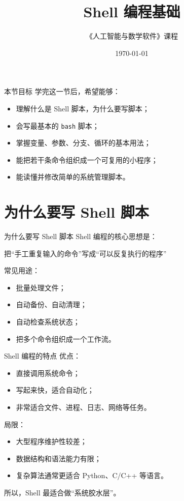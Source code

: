 \documentclass[aspectratio=169]{beamer}
\title{Shell 编程基础}
\author{《人工智能与数学软件》课程}
\date{\today}
\begin{document}
\begin{frame}
  \titlepage
\end{frame}

\begin{frame}{本节目标}
学完这一节后，希望能够：
\begin{itemize}
  \item 理解什么是 Shell 脚本，为什么要写脚本；
  \item 会写最基本的 \texttt{bash} 脚本；
  \item 掌握变量、参数、分支、循环的基本用法；
  \item 能把若干条命令组织成一个可复用的小程序；
  \item 能读懂并修改简单的系统管理脚本。
\end{itemize}
\end{frame}

\section{为什么要写 Shell 脚本}

\begin{frame}{为什么要写 Shell 脚本}
Shell 编程的核心思想是：

\begin{center}
\Large
把“手工重复输入的命令”写成“可以反复执行的程序”
\end{center}

\vspace{0.5em}
常见用途：
\begin{itemize}
  \item 批量处理文件；
  \item 自动备份、自动清理；
  \item 自动检查系统状态；
  \item 把多个命令组织成一个工作流。
\end{itemize}
\end{frame}

\begin{frame}{Shell 编程的特点}
优点：
\begin{itemize}
  \item 直接调用系统命令；
  \item 写起来快，适合自动化；
  \item 非常适合文件、进程、日志、网络等任务。
\end{itemize}

\vspace{0.5em}
局限：
\begin{itemize}
  \item 大型程序维护性较差；
  \item 数据结构和语法能力有限；
  \item 复杂算法通常更适合 Python、C/C++ 等语言。
\end{itemize}

\vspace{0.5em}
所以，Shell 最适合做“\alert{系统胶水层}”。
\end{frame}
\end{document}
